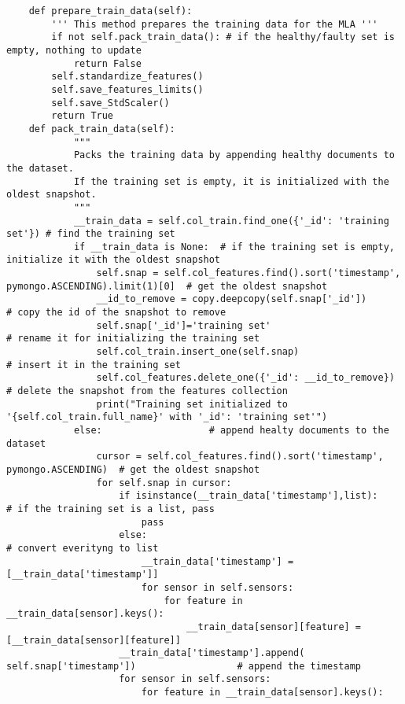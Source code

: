 \begin{verbatim}
    def prepare_train_data(self):
        ''' This method prepares the training data for the MLA '''
        if not self.pack_train_data(): # if the healthy/faulty set is empty, nothing to update
            return False
        self.standardize_features()
        self.save_features_limits()
        self.save_StdScaler()
        return True
    def pack_train_data(self):
            """
            Packs the training data by appending healthy documents to the dataset.
            If the training set is empty, it is initialized with the oldest snapshot.
            """
            __train_data = self.col_train.find_one({'_id': 'training set'}) # find the training set
            if __train_data is None:  # if the training set is empty, initialize it with the oldest snapshot
                self.snap = self.col_features.find().sort('timestamp', pymongo.ASCENDING).limit(1)[0]  # get the oldest snapshot
                __id_to_remove = copy.deepcopy(self.snap['_id'])                  # copy the id of the snapshot to remove
                self.snap['_id']='training set'                                                      # rename it for initializing the training set
                self.col_train.insert_one(self.snap)                                                  # insert it in the training set   
                self.col_features.delete_one({'_id': __id_to_remove})                  # delete the snapshot from the features collection
                print("Training set initialized to '{self.col_train.full_name}' with '_id': 'training set'") 
            else:                   # append healty documents to the dataset
                cursor = self.col_features.find().sort('timestamp', pymongo.ASCENDING)  # get the oldest snapshot
                for self.snap in cursor:
                    if isinstance(__train_data['timestamp'],list):                     # if the training set is a list, pass
                        pass
                    else:                                                            # convert everityng to list
                        __train_data['timestamp'] = [__train_data['timestamp']]
                        for sensor in self.sensors:
                            for feature in __train_data[sensor].keys():
                                __train_data[sensor][feature] = [__train_data[sensor][feature]]          
                    __train_data['timestamp'].append( self.snap['timestamp'])                  # append the timestamp
                    for sensor in self.sensors:
                        for feature in __train_data[sensor].keys():

\end{verbatim}
